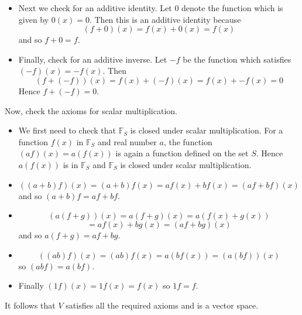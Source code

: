 \begin{solution}
\begin{itemize}
\item
Next we check for an additive identity.  Let $0$ denote the
function which is given by $0\left( x\right) =0.$ Then this is an additive
identity because 
\begin{equation*}
\left( f+0\right) \left( x\right) =f\left( x\right) +0\left( x\right)
=f\left( x\right)
\end{equation*}
and so $f+0=f$. 

\item
Finally, check for an additive inverse. Let $-f$ be the function which satisfies $\left( -f\right)
\left( x\right) = -f\left( x\right) .$ Then 
\begin{equation*}
\left( f+\left( -f\right) \right) \left( x\right) = f\left( x\right)
+\left( -f\right) \left( x\right) = f\left( x\right) +-f\left( x\right)
=0
\end{equation*}
Hence $f+\left( -f\right) =0$. 
\end{itemize}

Now, check the axioms for scalar multiplication.
\begin{itemize}
\item
We first need to check that $\mathbb{F}_S$ is closed under scalar multiplication. 
For a function $f(x)$ in $\mathbb{F}_S$ and real number $a$, the function $(af)(x) = a(f(x))$ is again a function defined on the set $S$. Hence $a(f(x))$ is in $\mathbb{F}_S$ and $\mathbb{F}_S$ is closed under scalar multiplication. 

\item
\begin{equation*}
\left( \left( a+b\right) f\right) \left( x\right) = \left( a+b\right)
f\left( x\right) =af\left( x\right) +bf\left( x\right) = \left(
af+bf\right) \left( x\right)
\end{equation*}
and so $\left( a+b\right) f=af+bf$. 

\item
\begin{equation*}
\left( a\left( f+g\right) \right) \left( x\right) = a\left( f+g\right)
\left( x\right) = a\left( f\left( x\right) +g\left( x\right) \right)
\end{equation*}
\begin{equation*}
=af\left( x\right) +bg\left( x\right) = \left( af+bg\right) \left(
x\right)
\end{equation*}
and so $a\left( f+g\right) =af+bg$. 

\item
\begin{equation*}
\left( \left( ab\right) f\right) \left( x\right) = \left( ab\right)
f\left( x\right) =a\left( bf\left( x\right) \right) = \left( a\left(
bf\right) \right) \left( x\right)
\end{equation*}
so $\left( abf\right) =a\left( bf\right) $. 

\item
Finally $\left( 1f\right) \left(
x\right) = 1f\left( x\right) =f\left( x\right) $ so $1f=f$.
\end{itemize}

It follows that $V$ satisfies all the required axioms and is a vector space.
\end{solution}

